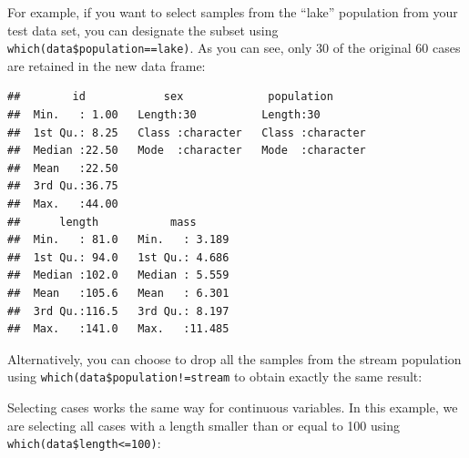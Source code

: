 \documentclass[
]{book}
\newenvironment{Shaded}{\begin{snugshade}}{\end{snugshade}}
\newcommand{\CommentTok}[1]{\textcolor[rgb]{0.56,0.35,0.01}{\textit{#1}}}
\newcommand{\FunctionTok}[1]{\textcolor[rgb]{0.00,0.00,0.00}{#1}}
\newcommand{\NormalTok}[1]{#1}
\newcommand{\OtherTok}[1]{\textcolor[rgb]{0.56,0.35,0.01}{#1}}
\newcommand{\SpecialCharTok}[1]{\textcolor[rgb]{0.00,0.00,0.00}{#1}}
\newcommand{\StringTok}[1]{\textcolor[rgb]{0.31,0.60,0.02}{#1}}
\begin{document}
For example, if you want to select samples from the ``lake'' population from your test data set, you can designate the subset using \texttt{which(data\$population==\textquotesingle{}lake\textquotesingle{})}. As you can see, only 30 of the original 60 cases are retained in the new data frame:

\begin{Shaded}
\end{Shaded}

\begin{verbatim}
##        id            sex             population       
##  Min.   : 1.00   Length:30          Length:30         
##  1st Qu.: 8.25   Class :character   Class :character  
##  Median :22.50   Mode  :character   Mode  :character  
##  Mean   :22.50                                        
##  3rd Qu.:36.75                                        
##  Max.   :44.00                                        
##      length           mass       
##  Min.   : 81.0   Min.   : 3.189  
##  1st Qu.: 94.0   1st Qu.: 4.686  
##  Median :102.0   Median : 5.559  
##  Mean   :105.6   Mean   : 6.301  
##  3rd Qu.:116.5   3rd Qu.: 8.197  
##  Max.   :141.0   Max.   :11.485
\end{verbatim}

Alternatively, you can choose to drop all the samples from the stream population using \texttt{which(data\$population!=\textquotesingle{}stream\textquotesingle{}} to obtain exactly the same result:

\begin{Shaded}
\end{Shaded}

Selecting cases works the same way for continuous variables. In this example, we are selecting all cases with a length smaller than or equal to 100 using \texttt{which(data\$length\textless{}=100)}:
\end{document}
